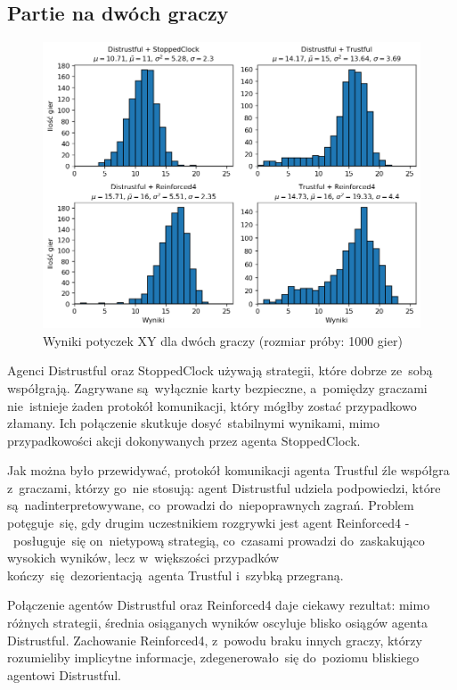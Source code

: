 \documentclass[declaration,shortabstract,inz]{iithesis}
\begin{document}
\subsection*{Partie na dwóch graczy}

\begin{figure}[H]
	\centering
	\captionsetup{format=hang}
	\includegraphics[width=\textwidth,height=\textheight,keepaspectratio]{XY2.png}
	\caption[Caption]{Wyniki potyczek XY dla dwóch graczy (rozmiar próby: 1000 gier)}
	\label{fig:XY2}
\end{figure}

Agenci Distrustful oraz StoppedClock używają strategii, które dobrze ze~sobą współgrają. Zagrywane są~wyłącznie karty bezpieczne, a~pomiędzy graczami nie~istnieje żaden protokół komunikacji, który mógłby zostać przypadkowo złamany. Ich połączenie skutkuje dosyć stabilnymi wynikami, mimo przypadkowości akcji dokonywanych przez agenta StoppedClock.

Jak można było przewidywać, protokół komunikacji agenta Trustful źle współgra z~graczami, którzy go~nie stosują: agent Distrustful udziela podpowiedzi, które są~nadinterpretowywane, co~prowadzi do~niepoprawnych zagrań. Problem potęguje~się, gdy drugim uczestnikiem rozgrywki jest agent Reinforced4 -~posługuje~się on~nietypową strategią, co~czasami prowadzi do~zaskakująco wysokich wyników, lecz w~większości przypadków kończy~się dezorientacją agenta Trustful i~szybką przegraną.

Połączenie agentów Distrustful oraz Reinforced4 daje ciekawy rezultat: mimo różnych strategii, średnia osiąganych wyników oscyluje blisko osiągów agenta Distrustful. Zachowanie Reinforced4, z~powodu braku innych graczy, którzy rozumieliby implicytne informacje, zdegenerowało~się do~poziomu bliskiego agentowi Distrustful.
\end{document}
